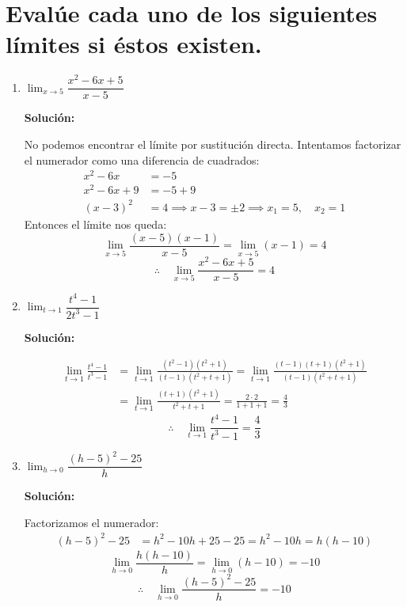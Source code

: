 \documentclass[12pt]{article}
\newcommand{\solucion}{%
    \vspace{0.8em}%
    \textbf{Solución:}%
}
\begin{document}
\section[Límites algebraicos]{Evalúe cada uno de los siguientes límites si éstos existen.}

\begin{enumerate}[label=\alph*)]
    \item $\lim_{x \to 5} \dfrac{x^2 - 6x + 5}{x - 5}$

    \solucion

    No podemos encontrar el límite por sustitución directa. Intentamos factorizar el numerador como una diferencia de cuadrados:
    \begin{align*}
        x^2 - 6x &= -5 \\
        x^2 - 6x + 9 &= -5 + 9 \\
        (x-3)^2 &= 4 \implies x - 3 = \pm 2 \implies x_1 = 5,\quad x_2 = 1
    \end{align*}
    Entonces el límite nos queda:
    \[
        \lim_{x\to5}\frac{(x-5)(x-1)}{x-5} = \lim_{x\to5}(x-1) = 4
    \]
    \[
        \therefore\quad \lim_{x\to5}\frac{x^2-6x+5}{x-5} = 4
    \]

    \item $\lim_{t \to 1} \dfrac{t^4-1}{2t^3-1}$

    \solucion
    \begin{align*}
        \lim_{t\to1}\frac{t^4-1}{t^3-1}
        &= \lim_{t\to1}\frac{(t^2-1)(t^2+1)}{(t-1)(t^2+t+1)}
        = \lim_{t\to1}\frac{(t-1)(t+1)(t^2+1)}{(t-1)(t^2+t+1)} \\
        &= \lim_{t\to1}\frac{(t+1)(t^2+1)}{t^2+t+1}
        = \frac{2 \cdot 2}{1+1+1} = \frac{4}{3}
    \end{align*}
    \[
        \therefore\quad \lim_{t\to1}\frac{t^4-1}{t^3-1} = \frac{4}{3}
    \]

    \item $\lim_{h \to 0} \dfrac{(h - 5)^2 - 25}{h}$

    \solucion

    Factorizamos el numerador:
    \begin{align*}
        (h-5)^2 - 25 &= h^2 - 10h + 25 - 25 = h^2 - 10h = h(h-10)
    \end{align*}
    \[
        \lim_{h\to0}\frac{h(h-10)}{h} = \lim_{h\to0}(h-10) = -10
    \]
    \[
        \therefore\quad \lim_{h\to0}\frac{(h-5)^2-25}{h} = -10
    \]


\end{enumerate}
\end{document}

